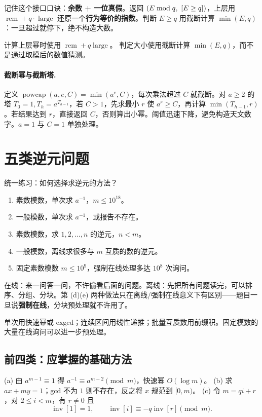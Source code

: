 \begin{tip}
记住这个接口口诀：\textbf{余数 + 一位真假}。返回 $(E\bmod q,\ \left[E\ge q\right])$，上层用 $\operatorname{rem}+q\cdot\operatorname{large}$ 还原一个\textbf{行为等价的指数}。判断 $E\ge q$ 用截断计算 $\min(E,q)$：一旦超过就停下，绝不构造大数。
\end{tip}

计算上层幂时使用 $\operatorname{rem}+q\operatorname{large}$。
判定大小使用截断计算 $\min(E,q)$，而不是通过取模后的数值猜测。

\paragraph{截断幂与截断塔.} 定义 $\operatorname{powcap}(a,e,C)=\min(a^e,C)$，每次乘法超过 $C$ 就截断。对 $a\ge2$ 的塔 $T_0=1,T_h=a^{T_{h-1}}$，若 $C>1$，先求最小 $r$ 使 $a^r\ge C$，再计算 $\min(T_{h-1},r)$。若结果达到 $r$，直接返回 $C$，否则算出小幂。阈值迅速下降，避免构造天文数字。$a=1$ 与 $C=1$ 单独处理。


\section{五类逆元问题}
\begin{problem}{统一练习：如何选择求逆元的方法？}
\begin{enumerate}[label=(\alph*)]
\item 素数模数，单次求 $a^{-1}$，$m\le10^{18}$。
\item 一般模数，单次求 $a^{-1}$，或报告不存在。
\item 素数模数，求 $1,2,\ldots,n$ 的逆元，$n<m$。
\item 一般模数，离线求很多与 $m$ 互质的数的逆元。
\item 固定素数模数 $m\le10^9$，强制在线处理多达 $10^8$ 次询问。
\end{enumerate}
\end{problem}

\begin{tip}[在线/离线]
在线：来一问答一问，不许偷看后面的问题。离线：先把所有问题读完，可以排序、分组、分块。第 (d)(e) 两种做法只在离线/强制在线意义下有区别——题目一旦说\textbf{强制在线}，分块预处理就不许用了。
\end{tip}

\hint 单次用快速幂或 exgcd；连续区间用线性递推；批量互质数用前缀积。固定模数的大量在线询问可以进一步预处理。


\subsection{前四类：应掌握的基础方法}
(a) 由 $a^{m-1}\equiv1$ 得 $a^{-1}\equiv a^{m-2}\pmod m$，快速幂 $O(\log m)$。
(b) 求 $ax+my=1$；gcd 不为 $1$ 则不存在，反之将 $x$ 规范到 $[0,m)$。
(c) 令 $m=qi+r$，对 $2\le i<m$，有 $r\ne0$ 且
\[
 \operatorname{inv}[1]=1,\qquad
 \operatorname{inv}[i]\equiv-q\operatorname{inv}[r]\pmod m.
\]

